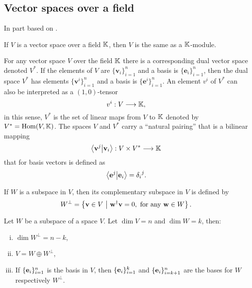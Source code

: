 \subsection{Vector spaces over a field}

In part based on \cite{Jeevanjee}.

\begin{remark}[Modules]
	If $V$ is a vector space over a field $\mathbb{K}$, then $V$ is the same as a $\mathbb{K}$-module.
\end{remark}

\begin{definition}
	For any vector space $V$ over the field $\mathbb{K}$ there is a corresponding dual vector space denoted $V^*$. If the elements of $V$ are $\{\mathbf{v}_i\}_{i=1}^n$ and a basis is $\{\mathbf{e}_i\}_{i=1}^n$, then the dual space $V^*$ has elements $\{\mathbf{v}^i\}_{i=1}^n$ and a basis is $\{\mathbf{e}^i\}_{i=1}^n$. An element $v^i$ of $V^*$ can also be interpreted as a $(1,0)$-tensor
	\[
	v^i: V \longrightarrow \mathbb{K},
	\]
	in this sense, $V^*$ is the set of linear maps from $V$ to $\mathbb{K}$ denoted by $V^* = \text{Hom}(V,\mathbb{K})$.
	The spaces $V$ and $V^*$ carry a ``natural pairing'' that is a bilinear mapping
	\[
	\bra{\mathbf{v}^j}\ket{\mathbf{v}_i}: V \times V^* \longrightarrow \mathbb{K}
	\]
	that for basis vectors is defined as
	\[
	\bra{\mathbf{e}^j}\ket{\mathbf{e}_i} = {\delta_i}^j.
	\]
\end{definition}

\begin{definition}
	\cite[12.7]{holst} If $W$ is a subspace in $V$, then its complementary subspace in $V$ is defined by 
	\[
	W^\perp = \left\lbrace \mathbf{v} \in V \ \middle\vert \ \mathbf{w}^\dagger \mathbf{v} = 0, \text{ for any } \mathbf{w} \in W \right\rbrace.
	\]
\end{definition}

\begin{lemma}\label{lemma:compsubspace}\cite[Thm 12.16]{holst}
	Let $W$ be a subspace of a space $V$. Let $\dim V = n$ and $\dim W = k$, then:
	\noindent
	\begin{enumerate}[i)]
		\setlength\itemsep{-0.5em}
		\item $\dim W^\perp = n - k$,
		\item $V = W \oplus W^\perp$,
		\item If $\{\mathbf{e}_i\}_{i=1}^{n}$ is the basis in $V$, then $\{\mathbf{e}_i\}_{i=1}^{k}$ and $\{\mathbf{e}_i\}_{i=k+1}^{n}$ are the bases for $W$ respectively $W^\perp$.
	\end{enumerate}
\end{lemma}

